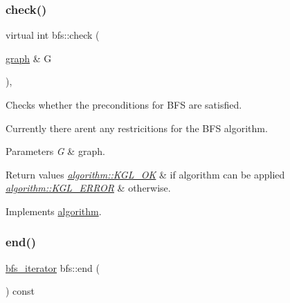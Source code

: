 \subsubsection{\texorpdfstring{check()}{check()}}
{\footnotesize\ttfamily virtual int bfs\+::check (\begin{DoxyParamCaption}\item[{\mbox{\hyperlink{classgraph}{graph}} \&}]{G }\end{DoxyParamCaption})\hspace{0.3cm}{\ttfamily [inline]}, {\ttfamily [virtual]}}



Checks whether the preconditions for B\+FS are satisfied. 

Currently there aren\textquotesingle{}t any restricitions for the B\+FS algorithm.


\begin{DoxyParams}{Parameters}
{\em G} & graph. \\
\hline
\end{DoxyParams}

\begin{DoxyRetVals}{Return values}
{\em \mbox{\hyperlink{classalgorithm_af1a0078e153aa99c24f9bdf0d97f6710aae4c1cd7fe8d8cf4b143241a6e7c31cf}{algorithm\+::\+K\+G\+L\+\_\+\+OK}}} & if algorithm can be applied \\
\hline
{\em \mbox{\hyperlink{classalgorithm_af1a0078e153aa99c24f9bdf0d97f6710ae67bf27b2ef31f73e545a7f9f4a69556}{algorithm\+::\+K\+G\+L\+\_\+\+E\+R\+R\+OR}}} & otherwise. \\
\hline
\end{DoxyRetVals}


Implements \mbox{\hyperlink{classalgorithm_a76361fb03ad1cf643affc51821e43bed}{algorithm}}.

\mbox{\label{classbfs_ac35b3d3c37d33eb80adb752e17a60df9}} 
\subsubsection{\texorpdfstring{end()}{end()}}
{\footnotesize\ttfamily \mbox{\hyperlink{classbfs_acafce54954100cc7bc9f80eb318a7bee}{bfs\+\_\+iterator}} bfs\+::end (\begin{DoxyParamCaption}{ }\end{DoxyParamCaption}) const\hspace{0.3cm}{\ttfamily [inline]}}



